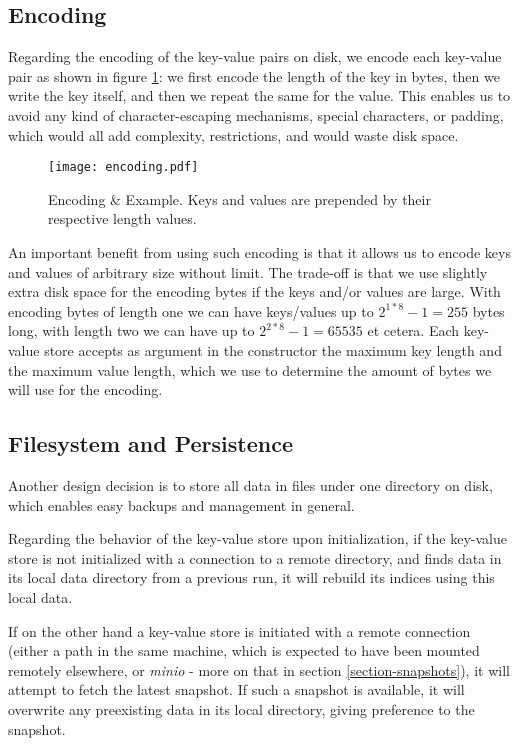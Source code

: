 \subsection{Encoding}

Regarding the encoding of the key-value pairs on disk, we encode each key-value pair as shown in figure \ref{fig:encoding}: we first encode the length of the key in bytes, then we write the key itself, and then we repeat the same for the value. This enables us to avoid any kind of character-escaping mechanisms, special characters, or padding, which would all add complexity, restrictions, and would waste disk space.

\begin{figure}[h]
    \centering
    \texttt{[image: encoding.pdf]}
    \caption{Encoding \& Example. Keys and values are prepended by their respective length values.}
    \label{fig:encoding}
\end{figure}

An important benefit from using such encoding is that it allows us to encode keys and values of arbitrary size without limit. The trade-off is that we use slightly extra disk space for the encoding bytes if the keys and/or values are large. With encoding bytes of length one we can have keys/values up to $2^{1*8}-1=255$ bytes long, with length two we can have up to $2^{2*8}-1=65535$ et cetera. Each key-value store accepts as argument in the constructor the maximum key length and the maximum value length, which we use to determine the amount of bytes we will use for the encoding.

\subsection{Filesystem and Persistence}

Another design decision is to store all data in files under one directory on disk, which enables easy backups and management in general.

Regarding the behavior of the key-value store upon initialization, if the key-value store is not initialized with a connection to a remote directory, and finds data in its local data directory from a previous run, it will rebuild its indices using this local data.

If on the other hand a key-value store is initiated with a remote connection (either a path in the same machine, which is expected to have been mounted remotely elsewhere, or \textit{minio} - more on that in section \ref{section-snapshots}), it will attempt to fetch the latest snapshot. If such a snapshot is available, it will overwrite any preexisting data in its local directory, giving preference to the snapshot.

